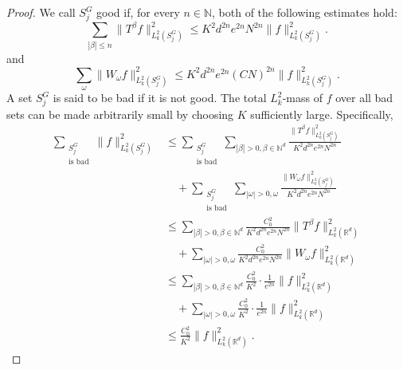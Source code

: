 \documentclass[12pt]{article}
\begin{document}
\begin{proof}
We call $S_j^G$ good if, for every $n\in\mathbb{N}$, both of the following estimates hold:
\[
\sum_{|\beta|\le n}\|T^\beta f\|_{L_k^2(S_j^G)}^2 \le K^2 d^{2n} e^{2n} N^{2n}\|f\|_{L_k^2(S_j^G)}^2.
\]
and
\[
\sum_{\omega}\|W_\omega f\|_{L_k^2(S_j^G)}^2 \le K^2 d^{2n} e^{2n} (CN)^{2n}\|f\|_{L_k^2(S_j^G)}^2.
\]
A set $S_j^G$ is said to be bad if it is not good. The total $L_k^2$-mass of $f$ over all bad sets can be made arbitrarily small by choosing $K$ sufficiently large. Specifically,
\begin{equation}\label{E19}
\begin{aligned}
\sum_{\substack{S_j^G \\ \text{is bad}}}\|f\|_{L_k^2(S_j^G)}^2
&\le \sum_{\substack{S_j^G \\ \text{is bad}}}\sum_{|\beta|>0,\beta\in \mathbb{N}^d}\frac{\|T^\beta f\|_{L_k^2(S_j^G)}^2}{K^2 d^{2n}e^{2n}N^{2n}}\\
&\quad + \sum_{\substack{S_j^G \\ \text{is bad}}}\sum_{|\omega|>0,\omega }\frac{\|W_\omega f\|_{L_k^2(S_j^G)}^2}{K^2 d^{2n}e^{2n}N^{2n}}\\
&\le \sum_{|\beta|>0, \beta\in \mathbb{N}^d}\frac{C_0^2}{K^2 d^{2n}e^{2n}N^{2n}}\|T^\beta f\|_{L_k^2(\mathbb{R}^d)}^2\\
&\quad + \sum_{|\omega|>0,\omega}\frac{C_0^2}{K^2 d^{2n}e^{2n}N^{2n}}\|W_\omega f\|_{L_k^2(\mathbb{R}^d)}^2  \\
&\le \sum_{|\beta|>0, \beta\in \mathbb{N}^d}\frac{C_0^2}{K^2}\cdot\frac{1}{e^{2n}}\|f\|_{L_k^2(\mathbb{R}^d)}^2\\
&\quad + \sum_{|\omega|>0,\omega}\frac{C_0^2}{K^2}\cdot\frac{1}{e^{2n}}\|f\|_{L_k^2(\mathbb{R}^d)}^2 \\
&\le \frac{C_0^2}{K^2}\|f\|_{L_k^2(\mathbb{R}^d)}^2.
\end{aligned}
\end{equation}


\end{proof}
\end{document}
